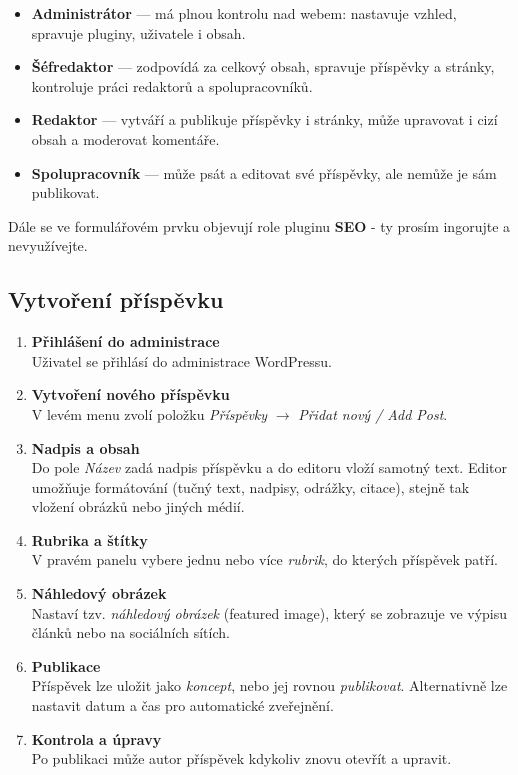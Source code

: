 \documentclass[12pt,a4paper]{article}
\begin{document}
	
	\begin{itemize}
		\item \textbf{Administrátor} — má plnou kontrolu nad webem: nastavuje vzhled, spravuje pluginy, uživatele i obsah.
		\item \textbf{Šéfredaktor} — zodpovídá za celkový obsah, spravuje příspěvky a stránky, kontroluje práci redaktorů a spolupracovníků.
		\item \textbf{Redaktor} — vytváří a publikuje příspěvky i stránky, může upravovat i cizí obsah a moderovat komentáře.
		\item \textbf{Spolupracovník} — může psát a editovat své příspěvky, ale nemůže je sám publikovat.
	\end{itemize}
	
	Dále se ve formulářovém prvku objevují role pluginu \textbf{SEO} - ty prosím ingorujte a nevyužívejte.
	
	\newpage
	\subsection{Vytvoření příspěvku}
	
	\begin{enumerate}
		\item \textbf{Přihlášení do administrace} \\
		Uživatel se přihlásí do administrace WordPressu.
		
		\item \textbf{Vytvoření nového příspěvku} \\
		V levém menu zvolí položku \emph{Příspěvky} $\rightarrow$ \emph{Přidat nový / Add Post}.
		
		\item \textbf{Nadpis a obsah} \\
		Do pole \emph{Název} zadá nadpis příspěvku a do editoru vloží samotný text. 
		Editor umožňuje formátování (tučný text, nadpisy, odrážky, citace), 
		stejně tak vložení obrázků nebo jiných médií.
		
		\item \textbf{Rubrika a štítky} \\
		V pravém panelu vybere jednu nebo více \emph{rubrik}, do kterých příspěvek patří. 
		
		\item \textbf{Náhledový obrázek} \\
		Nastaví tzv. \emph{náhledový obrázek} (featured image), 
		který se zobrazuje ve výpisu článků nebo na sociálních sítích.
		
		\item \textbf{Publikace} \\
		Příspěvek lze uložit jako \emph{koncept}, 
		nebo jej rovnou \emph{publikovat}. 
		Alternativně lze nastavit datum a čas pro automatické zveřejnění.
		
		\item \textbf{Kontrola a úpravy} \\
		Po publikaci může autor příspěvek kdykoliv znovu otevřít a upravit.
	\end{enumerate}
	
\end{document}
